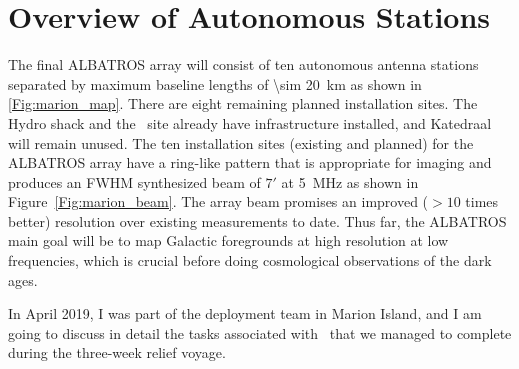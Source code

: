 \section{Overview of Autonomous Stations}\label{s:autonomous}

The final ALBATROS array will consist of ten autonomous antenna stations separated by maximum baseline lengths of \SI{\sim 20}{\kilo \meter} as shown in \autoref{Fig:marion_map}. There are eight remaining planned installation sites. The Hydro shack and the \prizm\ site already have infrastructure installed, and Katedraal will remain unused. The ten installation sites (existing and planned) for the ALBATROS array have a ring-like pattern that is appropriate for imaging and produces an FWHM synthesized beam of $7'$ at \SI{5}{\mega\hertz} as shown in Figure~\ref{Fig:marion_beam}. The array beam promises an improved ($>10$ times better) resolution over existing measurements to date. Thus far, the ALBATROS main goal will be to map Galactic foregrounds at high resolution at low frequencies, which is crucial before doing cosmological observations of the dark ages. 

In April 2019, I was part of the deployment team in Marion Island, and I am going to discuss in detail the tasks associated with \albatros\ that we managed to complete during the three-week relief voyage.  

